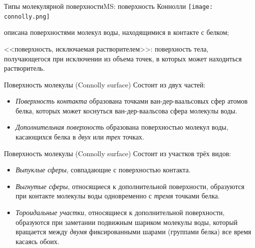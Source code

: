 \documentclass{beamer}
\begin{document}
    \begin{frame}{Типы молекулярной поверхности}{MS: поверхность Коннолли}
        \texttt{[image: connolly.png]}

        описана поверхностями молекул воды, находящимися в контакте с белком;

        <<поверхность, исключаемая растворителем>>:
        поверхность тела, получающегося при исключении из объема точек,
        в которых может находиться растворитель.
    \end{frame}

    \begin{frame}{Поверхность молекулы (Connolly surface)}
        Состоит из двух частей:
        \begin{itemize}
        \item \emph{Поверхность контакта} образована точками ван-дер-ваальсовых
            сфер атомов белка, которых может коснуться ван-дер-ваальсова сфера
            молекулы воды.
        \item \emph{Дополнительная поверхность} образована поверхностью
            молекул воды, касающихся белка в \emph{двух} или \emph{трех} точках.
        \end{itemize}
    \end{frame}

    \begin{frame}{Поверхность молекулы (Connolly surface)}
        Состоит из участков трёх видов:
        \begin{itemize}
        \item \emph{Выпуклые сферы}, совпадающие с поверхностью контакта.
        \item \emph{Выгнутые сферы}, относящиеся к дополнительной поверхности,
            образуются при контакте молекулы воды одновременно с \emph{тремя}
            точками белка.
        \item \emph{Тороидальные участки},
            относящиеся к дополнительной поверхности,
            образуются при заметании подвижным шариком молекулы воды,
            который вращается между \emph{двумя} фиксированными шарами
            (группами белка) все время касаясь обоих.
        \end{itemize}
    \end{frame}
\end{document}
